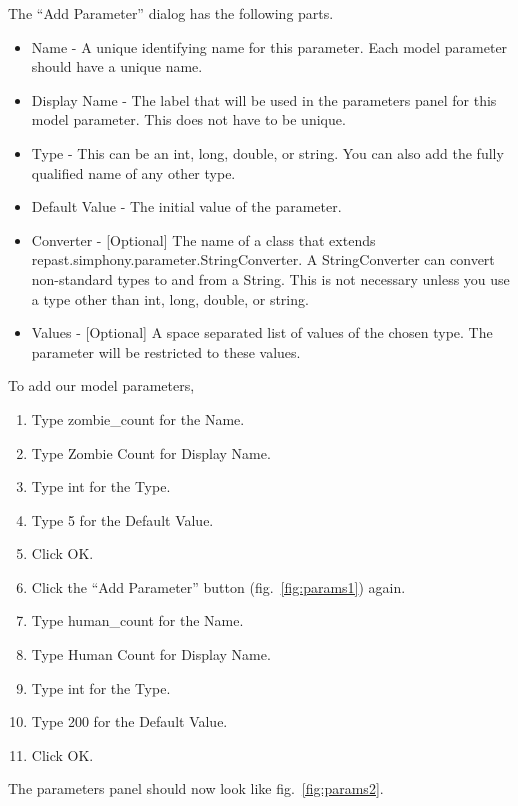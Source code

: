 \documentclass[11pt]{amsart}
\begin{document}
\vspace{.2in}
The  ``Add Parameter'' dialog has the following parts.

\begin{itemize}
\item Name - A unique identifying name for this parameter. Each model parameter should have a unique name.
\item Display Name - The label that will be used in the parameters panel for this model parameter. This does not have to be unique.
\item Type - This can be an int, long, double, or string. You can also add the fully qualified name of any other type.
\item Default Value - The initial value of the parameter.
\item Converter - [Optional] The name of a class that extends\\ repast.simphony.parameter.StringConverter.  A StringConverter can convert non-standard types to and from a String. This is not necessary unless you use a type other than int, long, double, or string.
\item Values - [Optional] A space separated list of values of the chosen type. The parameter will be restricted to these values.
\end{itemize}
\vspace{.2in}

To add our model parameters,

\begin{enumerate}
\item Type zombie\_count for the Name.
\item Type Zombie Count for Display Name.
\item Type int for the Type.
\item Type 5 for the Default Value.
\item Click OK.
\item Click the ``Add Parameter'' button (fig.~\ref{fig:params1}) again.
\item Type human\_count for the Name.
\item Type Human Count for Display Name.
\item Type int for the Type.
\item Type 200 for the Default Value.
\item Click OK.
\end{enumerate}
\vspace{.2in}

The  parameters panel should now look like fig.~\ref{fig:params2}.
\end{document}
